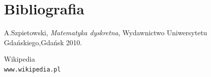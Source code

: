 \documentclass[12pt]{article}
\begin{document}
\newpage
\section{Bibliografia}

\begin{thebibliography}{9}



A.Szpietowski, \textit{Matematyka dyskretna}, Wydawnictwo Uniwersytetu Gdańskiego,Gdańsk 2010.


Wikipedia
\\\texttt{www.wikipedia.pl}


\end{thebibliography}
\end{document}
